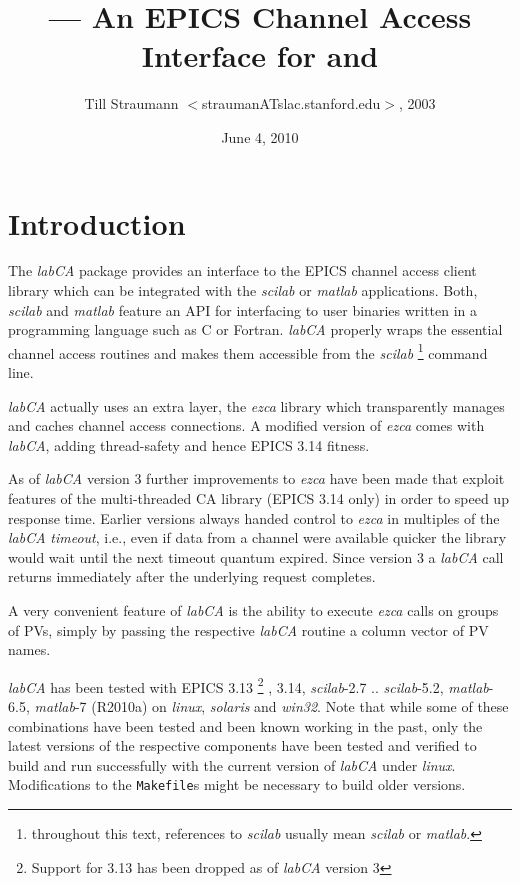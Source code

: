 \documentclass{article}
\title{\sca{} --- An EPICS Channel Access Interface for \scilab{} and \matlab{}}
\author{Till Straumann $<$straumanATslac.stanford.edu$>$, 2003}
\date{June 4, 2010}
\newcommand{\sca}{\ita{labCA}}
\newcommand{\scilab}{\ita{scilab}}
\newcommand{\matlab}{\ita{matlab}}
\newcommand{\windoze}{\ita{win32}}
\newcommand{\ezca}{\ita{ezca}}
\newcommand{\com}[1]{{\tt #1}}
\newcommand{\ita}[1]{\emph{#1}}
\begin{document}
\maketitle
{\hspace*{\fill}{\small\verb$Id: manual.tex,v 1.40 2010/06/04 20:50:32 strauman Exp $}\hspace*{\fill}}
\section{Introduction}
The \sca{} package provides an interface to the
EPICS channel access client library which can be
integrated with the \scilab{} or \matlab{} applications.
Both, \scilab{} and \matlab{} feature an API for interfacing
to user binaries written in a programming language such
as C or Fortran. \sca{} properly wraps the essential
channel access routines and makes them accessible
from the \scilab%
\footnote{throughout this text, references to \scilab{}
usually mean \scilab{} or \matlab.}
command line.

\sca{} actually uses an extra layer, the \ezca{} library
which transparently manages and caches channel access 
connections. A modified version of \ezca{} comes with
\sca, adding thread-safety and hence EPICS 3.14 fitness.

As of \sca{} version 3 further improvements to \ezca{}
have been made that exploit features of the multi-threaded
CA library (EPICS 3.14 only) in order to speed up response time.
Earlier versions always handed control to \ezca{} in multiples of the
\sca{} \ita{timeout}, i.e., even if data from a channel
were available quicker the library would wait until the
next timeout quantum expired. Since version 3 a \sca{}
call returns immediately after the underlying request
completes.

A very convenient feature of \sca{} is the ability
to execute \ezca{} calls on groups of PVs, simply by
passing the respective \sca{} routine a column vector
of PV names.

\sca{} has been tested with EPICS 3.13%
\footnote{Support for 3.13 has been dropped as of \sca{} version 3}%
,
3.14, \scilab-2.7 .. \scilab-5.2,
\matlab-6.5, \matlab-7 (R2010a) on \ita{linux}, \ita{solaris} and
\windoze. Note that while some of these combinations have been
tested and been known working in the past, only the latest
versions of the respective components have been tested
and verified to build and run successfully with the
current version of \sca{} under \ita{linux}.
Modifications to the \com{Makefile}s might be necessary to
build older versions.
\end{document}
